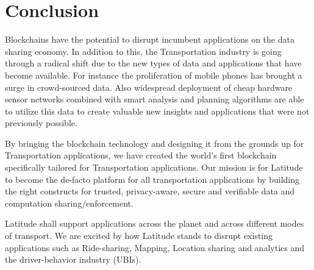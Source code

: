 \section{Conclusion}
\label{sec:conc}

Blockchains have the potential to disrupt incumbent applications on the data sharing economy. In addition to this, the
Transportation industry is going through a radical shift due to the new types of data and applications that have become
available. For instance the proliferation of mobile phones has brought a surge in crowd-sourced data. Also widespread
deployment of cheap hardware sensor networks combined with smart analysis and planning algorithms are able to utilize this
data to create valuable new insights and applications that were not previously possible.

By bringing the blockchain technology and designing it from the grounds up for Transportation applications, we have created
the world's first blockchain specifically tailored for Transportation applications. Our mission is for Latitude to become
the de-facto platform for all transportation applications by building the right constructs for trusted, privacy-aware,
secure and verifiable data and computation sharing/enforcement.

Latitude shall support applications across the planet and across different modes of transport. We
are excited by how Latitude stands to disrupt existing applications such as Ride-sharing, Mapping, Location sharing and
analytics and the driver-behavior industry (UBIs).
